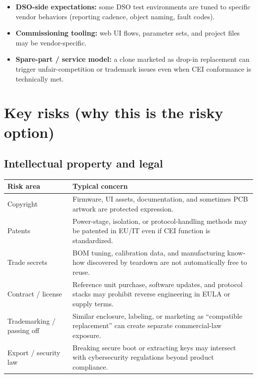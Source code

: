 \documentclass[11pt,a4paper]{article}
\begin{document}
\begin{itemize}[leftmargin=*]
  \item \textbf{DSO-side expectations:} some DSO test environments are tuned to specific vendor behaviors (reporting cadence,
        object naming, fault codes).
  \item \textbf{Commissioning tooling:} web UI flows, parameter sets, and project files may be vendor-specific.
  \item \textbf{Spare-part / service model:} a clone marketed as drop-in replacement can trigger unfair-competition or trademark issues
        even when CEI conformance is technically met.
\end{itemize}

\section{Key risks (why this is the risky option)}

\subsection{Intellectual property and legal}

\begin{tabularx}{\linewidth}{@{}lX@{}}
\toprule
\textbf{Risk area} & \textbf{Typical concern} \\
\midrule
Copyright &
Firmware, UI assets, documentation, and sometimes PCB artwork are protected expression. \\
Patents &
Power-stage, isolation, or protocol-handling methods may be patented in EU/IT even if CEI function is standardized. \\
Trade secrets &
BOM tuning, calibration data, and manufacturing know-how discovered by teardown are not automatically free to reuse. \\
Contract / license &
Reference unit purchase, software updates, and protocol stacks may prohibit reverse engineering in EULA or supply terms. \\
Trademarking / passing off &
Similar enclosure, labeling, or marketing as ``compatible replacement'' can create separate commercial-law exposure. \\
Export / security law &
Breaking secure boot or extracting keys may intersect with cybersecurity regulations beyond product compliance. \\
\bottomrule
\end{tabularx}
\end{document}
